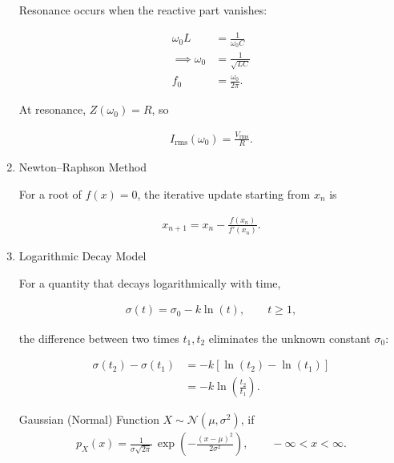 \begin{enumerate}[label=\thesubsection.\arabic*,ref=\thesubsection.\theenumi]
Resonance occurs when the reactive part vanishes:

\begin{align}
\omega_0 L&=\frac{1}{\omega_0 C}\\
\implies \omega_0 &=\frac{1}{\sqrt{LC}}\\
f_0 &=\frac{\omega_0}{2\pi}.
\end{align}

At resonance, $Z(\omega_0)=R$, so

\begin{align}
I_{\text{rms}}(\omega_0)=\frac{V_{\text{rms}}}{R}. \label{res}
\end{align}

\item Newton--Raphson Method

For a root of $f(x)=0$, the iterative update starting from $x_n$ is

\begin{align}
x_{n+1}=x_n-\frac{f(x_n)}{f'(x_n)}. \label{raphson}
\end{align}

\item Logarithmic Decay Model

For a quantity that decays logarithmically with time,

\begin{align}
\sigma(t)=\sigma_0-k\ln(t),\qquad t\ge 1,
\end{align}

the difference between two times $t_1,t_2$ eliminates the unknown
constant $\sigma_0$:

\begin{align}
\sigma(t_2)-\sigma(t_1)&=-k\left[\ln(t_2)-\ln(t_1)\right]\\
&=-k\ln\!\left(\frac{t_2}{t_1}\right). \label{decay}
\end{align}


\item [Gaussian (Normal) Function]
$X\sim\mathcal{N}(\mu,\sigma^{2})$, if 
\begin{align} 
	\label{eq:EE26BTECH11221-gaussian}
p_X(x)=\frac{1}{\sigma\sqrt{2\pi}}\,
\exp\!\left(-\frac{(x-\mu)^{2}}{2\sigma^{2}}\right),
\qquad -\infty<x<\infty.
\end{align}


\end{enumerate}
